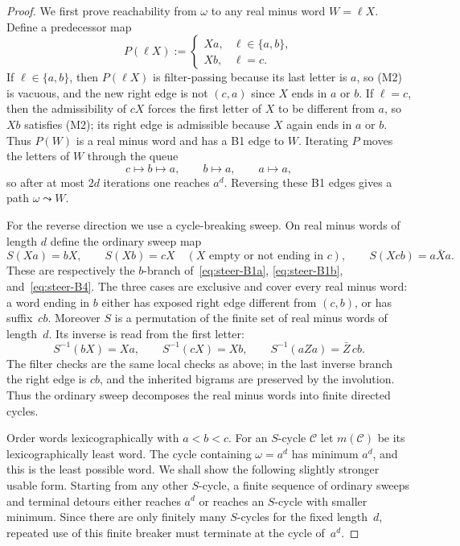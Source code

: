 \documentclass{amsart}
\theoremstyle{definition}
\theoremstyle{remark}
\begin{document}
\begin{proof}
We first prove reachability from $\omega$ to any real minus word
$W=\ell X$.  Define a predecessor map
\[
  P(\ell X) :=
  \begin{cases}
    Xa, & \ell\in\{a,b\},\\
    Xb, & \ell=c.
  \end{cases}
\]
If $\ell\in\{a,b\}$, then $P(\ell X)$ is filter-passing because its
last letter is $a$, so \textup{(M2)} is vacuous, and the new right
edge is not $(c,a)$ since $X$ ends in $a$ or $b$.  If $\ell=c$, then
the admissibility of $cX$ forces the first letter of $X$ to be
different from $a$, so $Xb$ satisfies \textup{(M2)}; its right edge is
admissible because $X$ again ends in $a$ or $b$.  Thus $P(W)$ is a
real minus word and has a B1 edge to $W$.  Iterating $P$ moves the
letters of $W$ through the queue
\[
  c\mapsto b\mapsto a,\qquad b\mapsto a,\qquad a\mapsto a,
\]
so after at most $2d$ iterations one reaches $a^d$.  Reversing these
B1 edges gives a path $\omega\leadsto W$.

For the reverse direction we use a cycle-breaking sweep.  On real
minus words of length $d$ define the ordinary sweep map
\[
  S(Xa)=bX,\qquad
  S(Xb)=cX\quad (X \text{ empty or not ending in }c),\qquad
  S(Xcb)=a\bar X a .
\]
These are respectively the $b$-branch of~\eqref{eq:steer-B1a},
\eqref{eq:steer-B1b}, and~\eqref{eq:steer-B4}.  The three cases are
exclusive and cover every real minus word: a word ending in $b$ either
has exposed right edge different from $(c,b)$, or has suffix~$cb$.
Moreover $S$ is a permutation of the finite set of real minus words of
length~$d$.  Its inverse is read from the first letter:
\[
  S^{-1}(bX)=Xa,\qquad
  S^{-1}(cX)=Xb,\qquad
  S^{-1}(aZa)=\bar Z\,cb .
\]
The filter checks are the same local checks as above; in the last
inverse branch the right edge is $cb$, and the inherited bigrams are
preserved by the involution.  Thus the ordinary sweep decomposes the
real minus words into finite directed cycles.

Order words lexicographically with $a<b<c$.  For an $S$-cycle
$\mathcal C$ let $m(\mathcal C)$ be its lexicographically least word.
The cycle containing $\omega=a^d$ has minimum $a^d$, and this is the
least possible word.  We shall show the following slightly stronger
usable form.  Starting from any other $S$-cycle, a finite sequence of
ordinary sweeps and terminal detours either reaches $a^d$ or reaches an
$S$-cycle with smaller minimum.  Since there are only finitely many
$S$-cycles for the fixed length~$d$, repeated use of this finite
breaker must terminate at the cycle of~$a^d$.


\end{proof}
\end{document}
